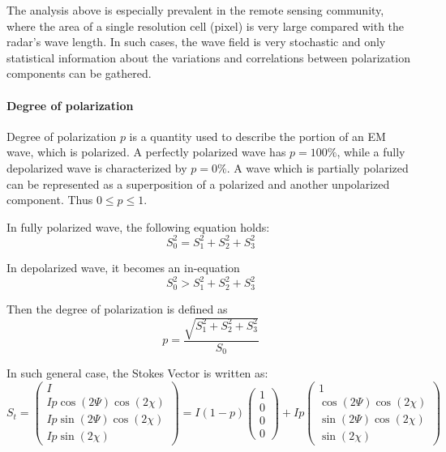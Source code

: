 The analysis above is especially prevalent in the remote sensing community, where the area of a single resolution cell (pixel) is very large compared with the radar's wave length.
In such cases, the wave field is very stochastic and only statistical information about the variations and correlations between polarization components can be gathered. 

\paragraph{Degree of polarization}

Degree of polarization $p$ is a quantity used to describe the portion of an EM wave, which is polarized.
A perfectly polarized wave has $p=100\%$, while a fully depolarized wave is characterized by $p=0\%$.
A wave which is partially polarized can be represented as a superposition of a polarized and another unpolarized component.
Thus $0 \leq p \leq 1$.

In fully polarized wave, the following equation holds:
\begin{equation}
S_0^2 = S_1^2 + S_2^2 + S_3^2
\end{equation}

In depolarized wave, it becomes an in-equation
\begin{equation}
S_0^2 > S_1^2 + S_2^2 + S_3^2
\end{equation}

Then the degree of polarization is defined as
\begin{equation}
p = \frac{\sqrt{ S_1^2 + S_2^2 + S_3^2 }}{S_0}
\end{equation}

In such general case, the Stokes Vector is written as:
\begin{equation}
S_t = 
\left(
\begin{array}{c}
 I \\
 I p \cos(2\Psi) \cos(2\chi) \\
 I p \sin(2\Psi) \cos(2\chi) \\
 I p \sin(2\chi)
\end{array}
\right)
 = I (1 - p)
\left(
\begin{array}{c}
 1 \\
 0 \\
 0 \\
 0
\end{array}
\right) 
+ I p
\left(
\begin{array}{c}
 1\\
 \cos(2\Psi) \cos(2\chi) \\
 \sin(2\Psi) \cos(2\chi) \\
 \sin(2\chi)
\end{array}
\right)
\end{equation}

